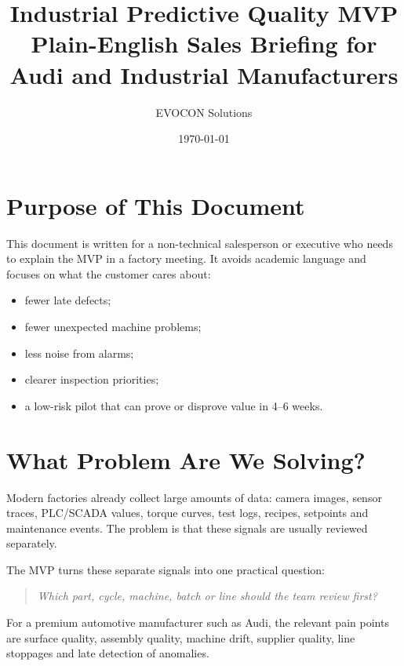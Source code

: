 \documentclass[11pt,a4paper]{article}
\title{\textbf{Industrial Predictive Quality MVP}\\Plain-English Sales Briefing for Audi and Industrial Manufacturers}
\author{EVOCON Solutions}
\date{\today}
\begin{document}
\maketitle

\begin{center}
\end{center}

\section{Purpose of This Document}
This document is written for a non-technical salesperson or executive who needs to explain the MVP in a factory meeting. It avoids academic language and focuses on what the customer cares about:
\begin{itemize}
  \item fewer late defects;
  \item fewer unexpected machine problems;
  \item less noise from alarms;
  \item clearer inspection priorities;
  \item a low-risk pilot that can prove or disprove value in 4--6 weeks.
\end{itemize}

\section{What Problem Are We Solving?}
Modern factories already collect large amounts of data: camera images, sensor traces, PLC/SCADA values, torque curves, test logs, recipes, setpoints and maintenance events. The problem is that these signals are usually reviewed separately.

The MVP turns these separate signals into one practical question:
\begin{quote}
\emph{Which part, cycle, machine, batch or line should the team review first?}
\end{quote}

For a premium automotive manufacturer such as Audi, the relevant pain points are surface quality, assembly quality, machine drift, supplier quality, line stoppages and late detection of anomalies.
\end{document}
